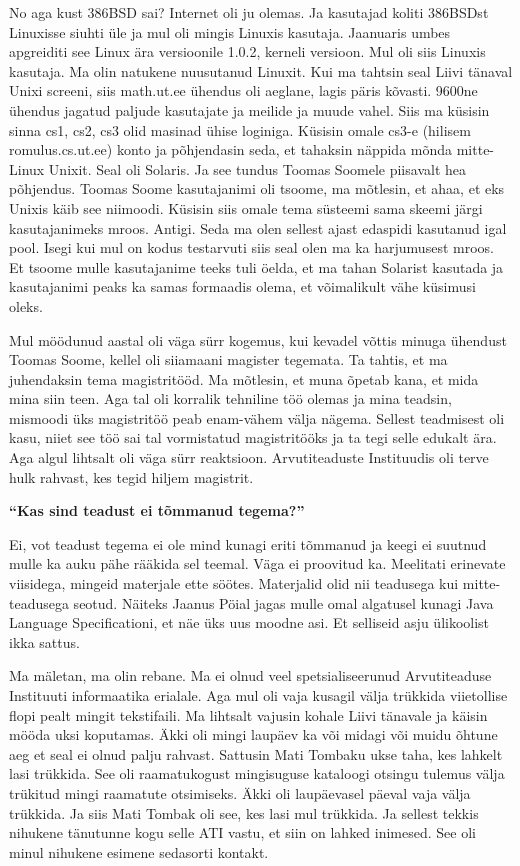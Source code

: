 No aga kust 386BSD sai? Internet oli ju olemas. Ja kasutajad koliti 386BSDst Linuxisse siuhti üle ja mul oli mingis Linuxis kasutaja. Jaanuaris umbes apgreiditi see Linux ära versioonile 1.0.2, kerneli versioon. Mul oli siis Linuxis kasutaja. Ma olin natukene nuusutanud Linuxit. Kui ma tahtsin seal Liivi tänaval Unixi screeni, siis math.ut.ee ühendus oli aeglane, lagis päris kõvasti. 9600ne ühendus jagatud paljude kasutajate ja meilide ja muude vahel. Siis ma küsisin sinna cs1, cs2, cs3 olid masinad ühise loginiga. Küsisin omale cs3-e (hilisem romulus.cs.ut.ee) konto ja põhjendasin seda, et tahaksin näppida mõnda mitte-Linux Unixit. Seal oli Solaris. Ja see tundus Toomas Soomele piisavalt hea põhjendus. Toomas Soome kasutajanimi oli tsoome, ma mõtlesin, et ahaa, et eks Unixis käib see niimoodi. Küsisin siis omale tema süsteemi sama skeemi järgi kasutajanimeks mroos. Antigi. Seda ma olen sellest ajast edaspidi kasutanud igal pool. Isegi kui mul on kodus testarvuti  siis seal olen ma ka harjumusest mroos. Et tsoome mulle kasutajanime teeks tuli öelda, et ma tahan Solarist kasutada ja kasutajanimi peaks ka samas formaadis olema, et võimalikult vähe küsimusi oleks. 

Mul möödunud aastal oli väga sürr kogemus, kui kevadel võttis minuga ühendust Toomas Soome, kellel oli siiamaani magister tegemata. Ta tahtis, et ma juhendaksin tema magistritööd. Ma mõtlesin, et muna õpetab kana, et mida mina siin teen. Aga tal oli korralik tehniline töö olemas ja mina teadsin, mismoodi üks magistritöö peab enam-vähem välja nägema. Sellest teadmisest oli kasu, niiet see töö sai tal vormistatud magistritööks ja ta tegi selle edukalt ära. Aga algul lihtsalt oli väga sürr reaktsioon. Arvutiteaduste Instituudis oli terve hulk rahvast, kes tegid hiljem magistrit. 

\textbf{\enquote{Kas sind teadust ei tõmmanud tegema?}} 

Ei, vot teadust tegema ei ole mind kunagi eriti tõmmanud ja keegi ei suutnud mulle ka auku pähe rääkida sel teemal. Väga ei proovitud ka. Meelitati erinevate viisidega, mingeid materjale ette söötes. Materjalid olid nii teadusega kui mitte-teadusega seotud. Näiteks Jaanus Pöial jagas mulle omal algatusel kunagi Java Language Specificationi, et näe üks uus moodne asi. Et selliseid asju ülikoolist ikka sattus. 

Ma mäletan, ma olin rebane. Ma ei olnud veel spetsialiseerunud Arvutiteaduse Instituuti informaatika erialale. Aga mul oli vaja kusagil välja trükkida viietollise flopi pealt mingit tekstifaili. Ma lihtsalt vajusin kohale Liivi tänavale ja käisin mööda uksi koputamas. Äkki oli mingi laupäev ka või midagi või muidu õhtune aeg et seal ei olnud palju rahvast. Sattusin Mati Tombaku ukse taha, kes lahkelt lasi trükkida. See oli raamatukogust mingisuguse kataloogi otsingu tulemus välja trükitud mingi raamatute otsimiseks. Äkki oli laupäevasel päeval vaja välja trükkida. Ja siis Mati Tombak oli see, kes lasi mul trükkida. Ja sellest tekkis nihukene tänutunne kogu selle ATI vastu, et siin on lahked inimesed. See oli minul nihukene esimene sedasorti kontakt. 

